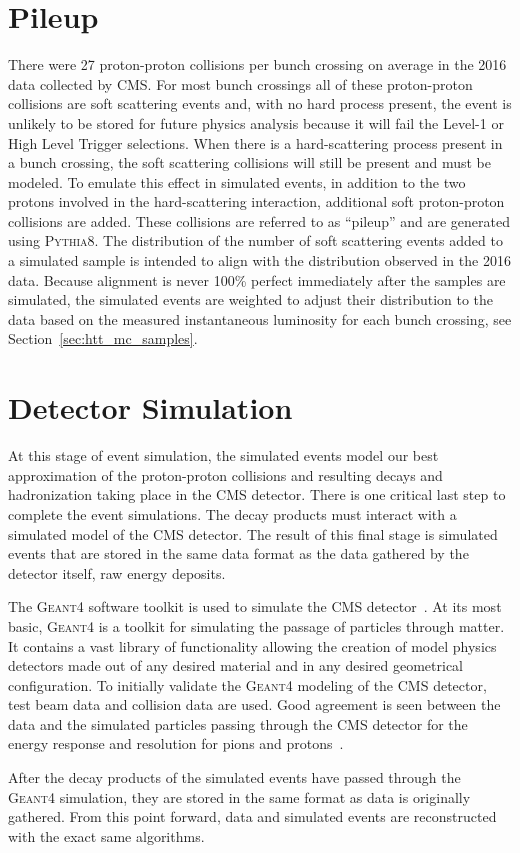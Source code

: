 \section{Pileup}
There were 27 proton-proton collisions per bunch crossing on average
in the 2016 data collected by CMS.
For most bunch crossings all of these proton-proton collisions are soft
scattering events and, with no hard process present, the event is unlikely to be stored for
future physics analysis because it will fail the Level-1 or High Level Trigger selections. 
When there is a hard-scattering process present in a bunch crossing,
the soft scattering collisions will still be present and must be modeled. 
To emulate this effect in simulated events, in addition to the two protons involved in the 
hard-scattering interaction, additional soft proton-proton collisions are added.
These collisions are referred to as ``pileup'' and are generated using
\textsc{Pythia8}. 
The distribution of the number of soft scattering events added to a simulated 
sample is intended to align with the distribution observed in the 2016 data.
Because alignment is never 100\% perfect immediately after the samples are simulated, the simulated events
are weighted to adjust their distribution to the data based on the measured instantaneous
luminosity for each bunch crossing, see Section~\ref{sec:htt_mc_samples}.



\section{Detector Simulation}
At this stage of event simulation, the simulated events model our best approximation
of the proton-proton collisions and resulting decays and hadronization taking place
in the CMS detector. There is one critical last step to complete the event
simulations. The decay products must interact with a simulated
model of the CMS detector. The result of this final stage is simulated events that
are stored in the same data format as the data gathered by the detector itself,
raw energy deposits.

The \textsc{Geant4} software toolkit is used to simulate the CMS 
detector~\cite{Agostinelli:2002hh}. At its most basic, \textsc{Geant4} is a 
toolkit for simulating the passage of particles through matter. It contains a 
vast library of functionality allowing the creation of model physics detectors
made out of any desired material and in any desired geometrical configuration.
To initially validate the \textsc{Geant4} modeling of the CMS detector, test beam data and
collision data are used. Good agreement is seen between the data and the
simulated particles passing through the CMS detector for the energy response
and resolution for pions and protons~\cite{geant4_cms_2017}.

After the decay products of the simulated events have passed through the \textsc{Geant4}
simulation, they are stored in the same format as data is originally gathered. From
this point forward, data and simulated events are reconstructed with the exact same 
algorithms.




